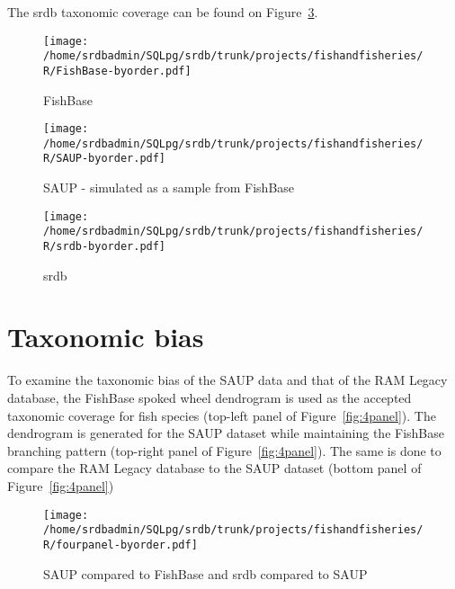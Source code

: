 \documentclass[letterpaper,12pt]{article}
\begin{document}
The srdb taxonomic coverage can be found on Figure~\ref{fig:srdb}.



\begin{figure}\label{fig:fishbase}
\begin{center}
\texttt{[image: /home/srdbadmin/SQLpg/srdb/trunk/projects/fishandfisheries/R/FishBase-byorder.pdf]}
\end{center}
\caption{FishBase}
\end{figure}


\begin{figure}\label{fig:SAUP}
\begin{center}
\texttt{[image: /home/srdbadmin/SQLpg/srdb/trunk/projects/fishandfisheries/R/SAUP-byorder.pdf]}
\end{center}
\caption{SAUP - simulated as a sample from FishBase}
\end{figure}

\begin{figure}\label{fig:srdb}
\begin{center}
\texttt{[image: /home/srdbadmin/SQLpg/srdb/trunk/projects/fishandfisheries/R/srdb-byorder.pdf]}
\end{center}
\caption{srdb}
\end{figure}


\section{Taxonomic bias}

To examine the taxonomic bias of the SAUP data and that of the RAM
Legacy database, the FishBase spoked wheel dendrogram is used as the
accepted taxonomic coverage for fish species (top-left panel of
Figure~\ref{fig:4panel}). The dendrogram is generated for the SAUP
dataset while maintaining the FishBase branching pattern (top-right
panel of Figure~\ref{fig:4panel}). The same is done to compare the RAM
Legacy database to the SAUP dataset (bottom panel of
Figure~\ref{fig:4panel})


\begin{figure}
\begin{center}
\texttt{[image: /home/srdbadmin/SQLpg/srdb/trunk/projects/fishandfisheries/R/fourpanel-byorder.pdf]}
\end{center}
\caption{SAUP compared to FishBase and srdb compared to SAUP}
\end{figure}\label{fig:4panel}
\end{document}
